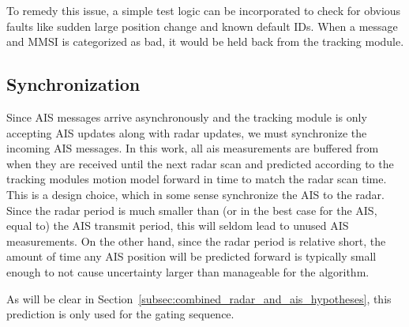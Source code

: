To remedy this issue, a simple test logic can be incorporated to check for obvious faults like sudden large position change and known default IDs. When a message and MMSI is categorized as bad, it would be held back from the tracking module. 

\subsection{Synchronization}
Since AIS messages arrive asynchronously and the tracking module is only accepting AIS updates along with radar updates, we must synchronize the incoming AIS messages. In this work, all \gls{ais} measurements are buffered from when they are received until the next radar scan and predicted according to the tracking modules motion model forward in time to match the radar scan time. This is a design choice, which in some sense synchronize the AIS to the radar. Since the radar period is much smaller than (or in the best case for the AIS, equal to) the AIS transmit period, this will seldom lead to unused AIS measurements. On the other hand, since the radar period is relative short, the amount of time any AIS position will be predicted forward is typically small enough to not cause uncertainty larger than manageable for the algorithm.

As will be clear in Section~\ref{subsec:combined_radar_and_ais_hypotheses}, this prediction is only used for the gating sequence.

